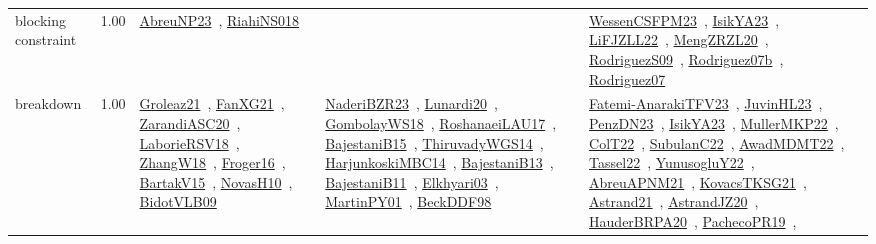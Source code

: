 {\begin{longtable}{p{3cm}r>{\raggedright\arraybackslash}p{6cm}>{\raggedright\arraybackslash}p{6cm}>{\raggedright\arraybackslash}p{8cm}}
\index{blocking constraint}\index{Concepts!blocking constraint}blocking constraint &  1.00 & \href{../works/AbreuNP23.pdf}{AbreuNP23}~\cite{AbreuNP23}, \href{../works/RiahiNS018.pdf}{RiahiNS018}~\cite{RiahiNS018} &  & \href{../works/WessenCSFPM23.pdf}{WessenCSFPM23}~\cite{WessenCSFPM23}, \href{../works/IsikYA23.pdf}{IsikYA23}~\cite{IsikYA23}, \href{../works/LiFJZLL22.pdf}{LiFJZLL22}~\cite{LiFJZLL22}, \href{../works/MengZRZL20.pdf}{MengZRZL20}~\cite{MengZRZL20}, \href{../works/RodriguezS09.pdf}{RodriguezS09}~\cite{RodriguezS09}, \href{../works/Rodriguez07b.pdf}{Rodriguez07b}~\cite{Rodriguez07b}, \href{../works/Rodriguez07.pdf}{Rodriguez07}~\cite{Rodriguez07}\\
\index{breakdown}\index{Concepts!breakdown}breakdown &  1.00 & \href{../works/Groleaz21.pdf}{Groleaz21}~\cite{Groleaz21}, \href{../works/FanXG21.pdf}{FanXG21}~\cite{FanXG21}, \href{../works/ZarandiASC20.pdf}{ZarandiASC20}~\cite{ZarandiASC20}, \href{../works/LaborieRSV18.pdf}{LaborieRSV18}~\cite{LaborieRSV18}, \href{../works/ZhangW18.pdf}{ZhangW18}~\cite{ZhangW18}, \href{../works/Froger16.pdf}{Froger16}~\cite{Froger16}, \href{../works/BartakV15.pdf}{BartakV15}~\cite{BartakV15}, \href{../works/NovasH10.pdf}{NovasH10}~\cite{NovasH10}, \href{../works/BidotVLB09.pdf}{BidotVLB09}~\cite{BidotVLB09} & \href{../works/NaderiBZR23.pdf}{NaderiBZR23}~\cite{NaderiBZR23}, \href{../works/Lunardi20.pdf}{Lunardi20}~\cite{Lunardi20}, \href{../works/GombolayWS18.pdf}{GombolayWS18}~\cite{GombolayWS18}, \href{../works/RoshanaeiLAU17.pdf}{RoshanaeiLAU17}~\cite{RoshanaeiLAU17}, \href{../works/BajestaniB15.pdf}{BajestaniB15}~\cite{BajestaniB15}, \href{../works/ThiruvadyWGS14.pdf}{ThiruvadyWGS14}~\cite{ThiruvadyWGS14}, \href{../works/HarjunkoskiMBC14.pdf}{HarjunkoskiMBC14}~\cite{HarjunkoskiMBC14}, \href{../works/BajestaniB13.pdf}{BajestaniB13}~\cite{BajestaniB13}, \href{../works/BajestaniB11.pdf}{BajestaniB11}~\cite{BajestaniB11}, \href{../works/Elkhyari03.pdf}{Elkhyari03}~\cite{Elkhyari03}, \href{../works/MartinPY01.pdf}{MartinPY01}~\cite{MartinPY01}, \href{../works/BeckDDF98.pdf}{BeckDDF98}~\cite{BeckDDF98} & \href{../works/Fatemi-AnarakiTFV23.pdf}{Fatemi-AnarakiTFV23}~\cite{Fatemi-AnarakiTFV23}, \href{../works/JuvinHL23.pdf}{JuvinHL23}~\cite{JuvinHL23}, \href{../works/PenzDN23.pdf}{PenzDN23}~\cite{PenzDN23}, \href{../works/IsikYA23.pdf}{IsikYA23}~\cite{IsikYA23}, \href{../works/MullerMKP22.pdf}{MullerMKP22}~\cite{MullerMKP22}, \href{../works/ColT22.pdf}{ColT22}~\cite{ColT22}, \href{../works/SubulanC22.pdf}{SubulanC22}~\cite{SubulanC22}, \href{../works/AwadMDMT22.pdf}{AwadMDMT22}~\cite{AwadMDMT22}, \href{../works/Tassel22.pdf}{Tassel22}~\cite{Tassel22}, \href{../works/YunusogluY22.pdf}{YunusogluY22}~\cite{YunusogluY22}, \href{../works/AbreuAPNM21.pdf}{AbreuAPNM21}~\cite{AbreuAPNM21}, \href{../works/KovacsTKSG21.pdf}{KovacsTKSG21}~\cite{KovacsTKSG21}, \href{../works/Astrand21.pdf}{Astrand21}~\cite{Astrand21}, \href{../works/AstrandJZ20.pdf}{AstrandJZ20}~\cite{AstrandJZ20}, \href{../works/HauderBRPA20.pdf}{HauderBRPA20}~\cite{HauderBRPA20}, \href{../works/PachecoPR19.pdf}{PachecoPR19}~\cite{PachecoPR19}, 
\end{longtable}}
